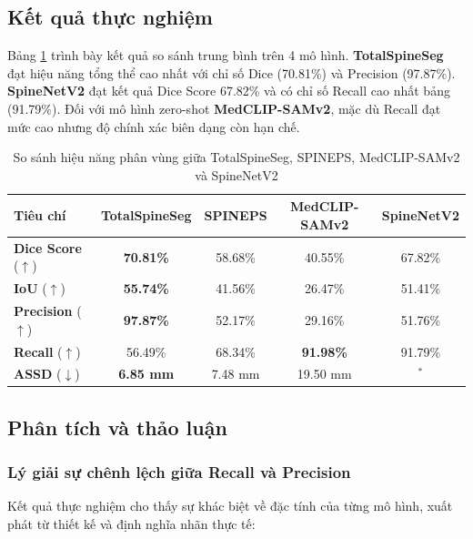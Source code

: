 \subsection{Kết quả thực nghiệm}
Bảng \ref{tab:seg_results} trình bày kết quả so sánh trung bình trên 4 mô hình. \textbf{TotalSpineSeg} đạt hiệu năng tổng thể cao nhất với chỉ số Dice (70.81\%) và Precision (97.87\%). \textbf{SpineNetV2} đạt kết quả Dice Score 67.82\% và có chỉ số Recall cao nhất bảng (91.79\%). Đối với mô hình zero-shot \textbf{MedCLIP-SAMv2}, mặc dù Recall đạt mức cao nhưng độ chính xác biên dạng còn hạn chế.

\begin{table}[H]
    \centering
    \caption{So sánh hiệu năng phân vùng giữa TotalSpineSeg, SPINEPS, MedCLIP-SAMv2 và SpineNetV2}
    \label{tab:seg_results}
    \renewcommand{\arraystretch}{1.2}
    \setlength{\tabcolsep}{4pt}
    \begin{tabular}{lcccc}
        \toprule
        \textbf{Tiêu chí} & \textbf{TotalSpineSeg} & \textbf{SPINEPS} & \textbf{MedCLIP-SAMv2} & \textbf{SpineNetV2} \\
        \midrule
        \textbf{Dice Score} ($\uparrow$) & \textbf{70.81\%} & 58.68\% & 40.55\% & 67.82\% \\
        \textbf{IoU} ($\uparrow$) & \textbf{55.74\%} & 41.56\% & 26.47\% & 51.41\% \\
        \textbf{Precision} ($\uparrow$) & \textbf{97.87\%} & 52.17\% & 29.16\% & 51.76\% \\
        \textbf{Recall} ($\uparrow$) & 56.49\% & 68.34\% & \textbf{91.98\%} & 91.79\% \\
        \textbf{ASSD} ($\downarrow$) & \textbf{6.85 mm} & 7.48 mm & 19.50 mm & {}$^*$ \\
        \bottomrule
    \end{tabular}
\end{table}

\subsection{Phân tích và thảo luận}

\subsubsection{Lý giải sự chênh lệch giữa Recall và Precision}
Kết quả thực nghiệm cho thấy sự khác biệt về đặc tính của từng mô hình, xuất phát từ thiết kế và định nghĩa nhãn thực tế:

